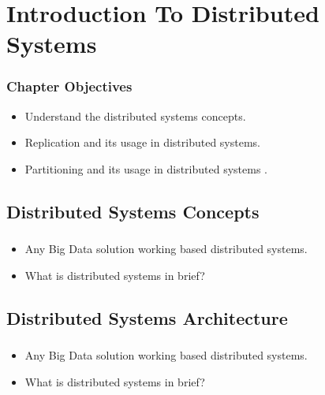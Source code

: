 \section{Introduction To Distributed Systems}

\begin{frame}
\frametitle{Chapter Objectives}

\begin{itemize}
	\item<1-> Understand the distributed systems concepts. \pause
	\item<2-> Replication and its usage in distributed systems.
	\item<3-> Partitioning and its usage in distributed systems . \pause

\end{itemize}

\end{frame}




\subsection{Distributed Systems Concepts}
\begin{frame}
\frametitle{\subsecname}
\begin{itemize} 
	\item Any Big Data solution working based distributed systems.
	\item What is distributed systems in brief?
\end{itemize}
\end{frame}




\subsection{Distributed Systems Architecture}
\begin{frame}
\frametitle{\subsecname}
\begin{itemize} 
	\item Any Big Data solution working based distributed systems.
	\item What is distributed systems in brief?
\end{itemize}
\end{frame}

